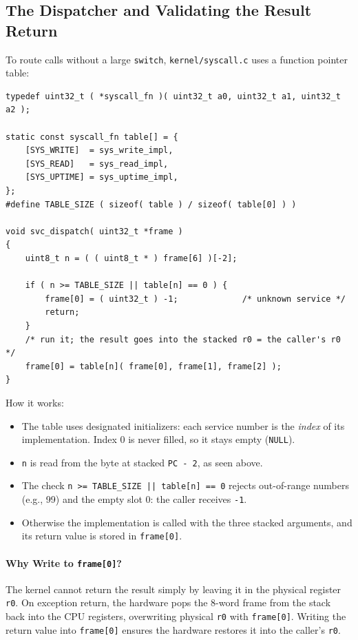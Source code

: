 \subsection{The Dispatcher and Validating the Result Return}
To route calls without a large \texttt{switch}, \texttt{kernel/syscall.c} uses a function pointer table:

\begin{lstlisting}
typedef uint32_t ( *syscall_fn )( uint32_t a0, uint32_t a1, uint32_t a2 );

static const syscall_fn table[] = {
    [SYS_WRITE]  = sys_write_impl,
    [SYS_READ]   = sys_read_impl,
    [SYS_UPTIME] = sys_uptime_impl,
};
#define TABLE_SIZE ( sizeof( table ) / sizeof( table[0] ) )

void svc_dispatch( uint32_t *frame )
{
    uint8_t n = ( ( uint8_t * ) frame[6] )[-2];

    if ( n >= TABLE_SIZE || table[n] == 0 ) {
        frame[0] = ( uint32_t ) -1;             /* unknown service */
        return;
    }
    /* run it; the result goes into the stacked r0 = the caller's r0 */
    frame[0] = table[n]( frame[0], frame[1], frame[2] );
}
\end{lstlisting}

How it works:
\begin{itemize}
    \item The table uses designated initializers: each service number is the \textit{index} of its implementation. Index 0 is never filled, so it stays empty (\texttt{NULL}).
    \item \texttt{n} is read from the byte at stacked \texttt{PC - 2}, as seen above.
    \item The check \texttt{n >= TABLE\_SIZE || table[n] == 0} rejects out-of-range numbers (e.g., 99) and the empty slot 0: the caller receives \texttt{-1}.
    \item Otherwise the implementation is called with the three stacked arguments, and its return value is stored in \texttt{frame[0]}.
\end{itemize}

\paragraph{Why Write to \texttt{frame[0]}?}
The kernel cannot return the result simply by leaving it in the physical register \texttt{r0}. On exception return, the hardware pops the 8-word frame from the stack back into the CPU registers, overwriting physical \texttt{r0} with \texttt{frame[0]}. Writing the return value into \texttt{frame[0]} ensures the hardware restores it into the caller's \texttt{r0}.

